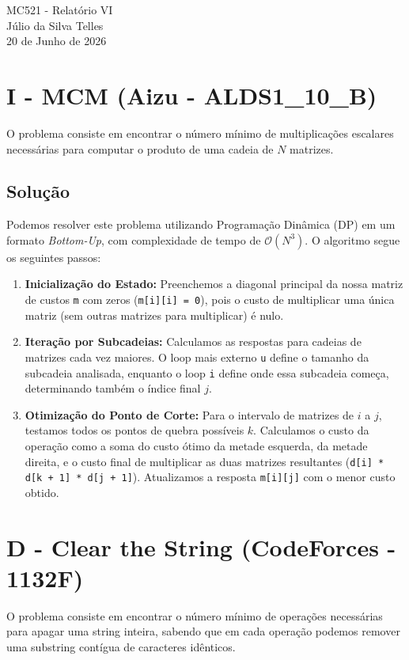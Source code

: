 \documentclass[12pt,a4paper]{article}
\begin{document}
\begin{center}
    {\LARGE MC521 - Relatório VI} \\ [2,5em]
    {\large Júlio da Silva Telles} \\ [1,0em]
    {\large 20 de Junho de 2026} \\ [1,5em]
\end{center}

\vspace{1cm} 

\section{I - MCM (Aizu - ALDS1\_10\_B)}
O problema consiste em encontrar o número mínimo de multiplicações escalares necessárias para computar o produto de uma cadeia de $N$ matrizes.

\subsection{Solução}
Podemos resolver este problema utilizando Programação Dinâmica (DP) em um formato \textit{Bottom-Up}, com complexidade de tempo de $\mathcal{O}(N^3)$. O algoritmo segue os seguintes passos:

\begin{enumerate}
    \item \textbf{Inicialização do Estado:} Preenchemos a diagonal principal da nossa matriz de custos \texttt{m} com zeros (\texttt{m[i][i] = 0}), pois o custo de multiplicar uma única matriz (sem outras matrizes para multiplicar) é nulo.
    \item \textbf{Iteração por Subcadeias:} Calculamos as respostas para cadeias de matrizes cada vez maiores. O loop mais externo \texttt{u} define o tamanho da subcadeia analisada, enquanto o loop \texttt{i} define onde essa subcadeia começa, determinando também o índice final $j$.
    \item \textbf{Otimização do Ponto de Corte:} Para o intervalo de matrizes de $i$ a $j$, testamos todos os pontos de quebra possíveis $k$. Calculamos o custo da operação como a soma do custo ótimo da metade esquerda, da metade direita, e o custo final de multiplicar as duas matrizes resultantes (\texttt{d[i] * d[k + 1] * d[j + 1]}). Atualizamos a resposta \texttt{m[i][j]} com o menor custo obtido.
\end{enumerate}

\section{D - Clear the String (CodeForces - 1132F)}
O problema consiste em encontrar o número mínimo de operações necessárias para apagar uma string inteira, sabendo que em cada operação podemos remover uma substring contígua de caracteres idênticos.
\end{document}
